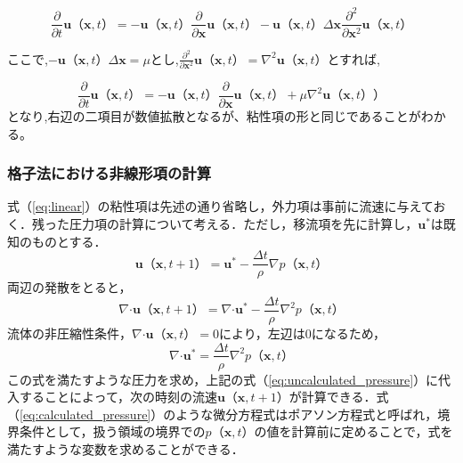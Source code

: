 \documentclass[a4j,12pt]{jreport}
\begin{document}
$$ \frac{\partial}{\partial t}\bm{u}（\bm{x},t） =  -\bm{u}（\bm{x},t）\frac{\partial}{\partial \bm{x}}\bm{u}（\bm{x},t） -\bm{u}（\bm{x},t）\varDelta \bm{x}\frac{\partial^2}{\partial \bm{x}^2}\bm{u}（\bm{x},t）$$

ここで,$ -\bm{u}（\bm{x},t）\varDelta \bm{x} = \mu$とし,$\frac{\partial^2}{\partial \bm{x}^2}\bm{u}（\bm{x},t） = \nabla^2\bm{u}（\bm{x},t）$とすれば,

$$ \frac{\partial}{\partial t}\bm{u}（\bm{x},t） =  -\bm{u}（\bm{x},t）\frac{\partial}{\partial \bm{x}}\bm{u}（\bm{x},t） +\mu\nabla^2\bm{u}（\bm{x},t））$$
となり,右辺の二項目が数値拡散となるが、粘性項の形と同じであることがわかる。
\subsubsection{格子法における非線形項の計算} \label{subsec:gridpressure}
式（\ref{eq:linear}）の粘性項は先述の通り省略し，外力項は事前に流速に与えておく．残った圧力項の計算について考える．ただし，移流項を先に計算し，$\bm{u}^*$は既知のものとする．
\begin{equation}\label{eq:uncalculated_pressure}
\bm{u}（\bm{x},t+1） =  \bm{u}^* - \frac{\varDelta t}{\rho}\nabla p（\bm{x},t）
\end{equation} 
両辺の発散をとると，
$$\nabla\boldsymbol{\cdot}\bm{u}（\bm{x},t+1） =  \nabla\boldsymbol{\cdot}\bm{u}^* - \frac{\varDelta t}{\rho}\nabla^2 p（\bm{x},t）$$
流体の非圧縮性条件，$\nabla\boldsymbol{\cdot}\bm{u}（\bm{x},t） = 0$により，左辺は0になるため，
\begin{equation}\label{eq:calculated_pressure}
\nabla\boldsymbol{\cdot}\bm{u}^* = \frac{\varDelta t}{\rho}\nabla^2 p（\bm{x},t）
\end{equation} 
この式を満たすような圧力を求め，上記の式（\ref{eq:uncalculated_pressure}）に代入することによって，次の時刻の流速$\bm{u}（\bm{x},t+1）$が計算できる．式（\ref{eq:calculated_pressure}）のような微分方程式はポアソン方程式と呼ばれ，境界条件として，扱う領域の境界での$p（\bm{x},t）$の値を計算前に定めることで，式を満たすような変数を求めることができる．
\end{document}
